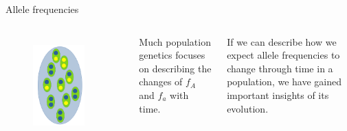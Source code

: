 \begin{frame}{Allele frequencies}

	\bigskip
        \begin{columns}


                \begin{figure}
                        \includegraphics[width=0.8\textwidth]{Pics/population} \
                \end{figure}


		\begin{block}{}
			Much population genetics focuses on describing the changes of $f_A$ and
			$f_a$ with time.
		\end{block}

		\bigskip
		\small

		If we can describe how we expect allele frequencies to change through time in a population, 
		we have gained important insights of its evolution.

        \end{columns}


\end{frame}


